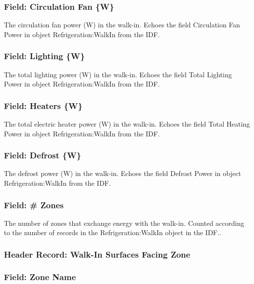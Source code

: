 \subsubsection{Field: Circulation Fan \{W\}}\label{field-circulation-fan-w}

The circulation fan power (W) in the walk-in. Echoes the field Circulation Fan Power in object Refrigeration:WalkIn from the IDF.

\subsubsection{Field: Lighting \{W\}}\label{field-lighting-w}

The total lighting power (W) in the walk-in. Echoes the field Total Lighting Power in object Refrigeration:WalkIn from the IDF.

\subsubsection{Field: Heaters \{W\}}\label{field-heaters-w}

The total electric heater power (W) in the walk-in. Echoes the field Total Heating Power in object Refrigeration:WalkIn from the IDF.

\subsubsection{Field: Defrost \{W\}}\label{field-defrost-w}

The defrost power (W) in the walk-in. Echoes the field Defrost Power in object Refrigeration:WalkIn from the IDF.

\subsubsection{Field: \# Zones}\label{field-zones}

The number of zones that exchange energy with the walk-in. Counted according to the number of records in the Refrigeration:WalkIn object in the IDF..

\subsubsection{Header Record: Walk-In Surfaces Facing Zone}\label{header-record-walk-in-surfaces-facing-zone}

\subsubsection{Field: Zone Name}\label{field-zone-name-13}

